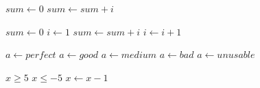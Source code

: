 \documentclass{article}
\begin{document}
\begin{algorithmic}[1]
  \State $sum\gets 0$
    \State $sum\gets sum+i$
  \EndFor
\end{algorithmic}

\begin{algorithmic}[1]
  \State $sum\gets 0$
  \State $i\gets 1$
    \State $sum\gets sum+i$
    \State $i\gets i+1$
  \EndWhile
\end{algorithmic}

\begin{algorithmic}[1]
    \State $a\gets perfect$
    \State $a\gets good$
    \State $a\gets medium$
    \State $a\gets bad$
  \Else
    \State $a\gets unusable$
  \EndIf
\end{algorithmic}

\begin{algorithmic}[1]
  \Require $x\ge5$
  \Ensure $x\le-5$
  \Statex
    \State $x\gets x-1$
  \EndWhile
\end{algorithmic}
\end{document}
